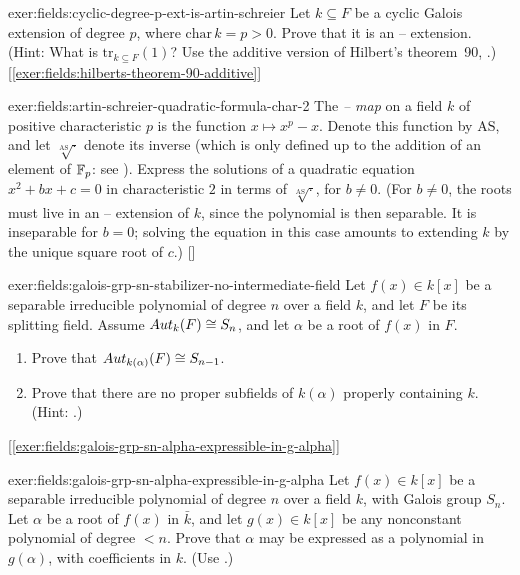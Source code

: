 \begin{exer}{}{exer:fields:cyclic-degree-p-ext-is-artin-schreier}
  Let $k \subseteq F$ be a cyclic Galois extension of degree $p$,
  where $\mathrm{char}\,k = p > 0$. Prove that it is an
  -- extension. (Hint: What is
  $\mathrm{tr}_{k \subseteq F}(1)$? Use the additive version of
  Hilbert's theorem~90,
  .)
  [\ref{exer:fields:hilberts-theorem-90-additive}]
\end{exer}
\begin{exer}{}{exer:fields:artin-schreier-quadratic-formula-char-2}
  The \emph{-- map} on a field $k$ of
  positive characteristic $p$ is the function $x \mapsto x^p - x$.
  Denote this function by $\mathrm{AS}$, and let
  $\sqrt[\mathrm{AS}]{\cdot}$ denote its inverse (which is only
  defined up to the addition of an element of $\mathbb{F}_p$: see
  ). Express the
  solutions of a quadratic equation $x^2 + bx + c = 0$ in
  characteristic $2$ in terms of $\sqrt[\mathrm{AS}]{\cdot}$, for
  $b \neq 0$. (For $b \neq 0$, the roots must live in an
  -- extension of $k$, since the polynomial
  is then separable. It is inseparable for $b = 0$; solving the
  equation in this case amounts to extending $k$ by the unique square
  root of $c$.)
  []
\end{exer}
\begin{exer}{}{exer:fields:galois-grp-sn-stabilizer-no-intermediate-field}
  Let $f(x) \in k[x]$ be a separable irreducible polynomial of degree
  $n$ over a field $k$, and let $F$ be its splitting field. Assume
  $Aut_k(F) \cong S_n$, and let $\alpha$ be a root of $f(x)$ in $F$.
  \begin{enumerate}[label=(\roman*)]
  \item Prove that $Aut_{k(\alpha)}(F) \cong S_{n-1}$.
  \item Prove that there are no proper subfields of $k(\alpha)$
    properly containing $k$. (Hint:
    .)
  \end{enumerate}
  [\ref{exer:fields:galois-grp-sn-alpha-expressible-in-g-alpha}]
\end{exer}
\begin{exer}{}{exer:fields:galois-grp-sn-alpha-expressible-in-g-alpha}
  Let $f(x) \in k[x]$ be a separable irreducible polynomial of degree
  $n$ over a field $k$, with Galois group $S_n$. Let $\alpha$ be a
  root of $f(x)$ in $\bar{k}$, and let $g(x) \in k[x]$ be any
  nonconstant polynomial of degree $< n$. Prove that $\alpha$ may be
  expressed as a polynomial in $g(\alpha)$, with coefficients in
  $k$. (Use
  .)
\end{exer}
